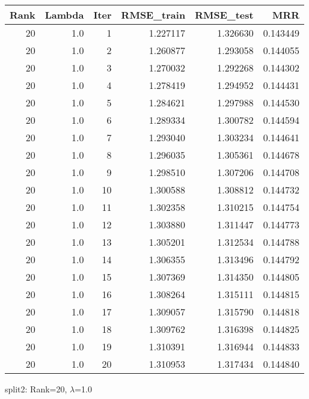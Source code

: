 \begin{tabular}{rrrrrr}
\toprule
 Rank &  Lambda &  Iter &  RMSE\_train &  RMSE\_test &       MRR \\
\midrule
   20 &     1.0 &     1 &    1.227117 &   1.326630 &  0.143449 \\
   20 &     1.0 &     2 &    1.260877 &   1.293058 &  0.144055 \\
   20 &     1.0 &     3 &    1.270032 &   1.292268 &  0.144302 \\
   20 &     1.0 &     4 &    1.278419 &   1.294952 &  0.144431 \\
   20 &     1.0 &     5 &    1.284621 &   1.297988 &  0.144530 \\
   20 &     1.0 &     6 &    1.289334 &   1.300782 &  0.144594 \\
   20 &     1.0 &     7 &    1.293040 &   1.303234 &  0.144641 \\
   20 &     1.0 &     8 &    1.296035 &   1.305361 &  0.144678 \\
   20 &     1.0 &     9 &    1.298510 &   1.307206 &  0.144708 \\
   20 &     1.0 &    10 &    1.300588 &   1.308812 &  0.144732 \\
   20 &     1.0 &    11 &    1.302358 &   1.310215 &  0.144754 \\
   20 &     1.0 &    12 &    1.303880 &   1.311447 &  0.144773 \\
   20 &     1.0 &    13 &    1.305201 &   1.312534 &  0.144788 \\
   20 &     1.0 &    14 &    1.306355 &   1.313496 &  0.144792 \\
   20 &     1.0 &    15 &    1.307369 &   1.314350 &  0.144805 \\
   20 &     1.0 &    16 &    1.308264 &   1.315111 &  0.144815 \\
   20 &     1.0 &    17 &    1.309057 &   1.315790 &  0.144818 \\
   20 &     1.0 &    18 &    1.309762 &   1.316398 &  0.144825 \\
   20 &     1.0 &    19 &    1.310391 &   1.316944 &  0.144833 \\
   20 &     1.0 &    20 &    1.310953 &   1.317434 &  0.144840 \\
\bottomrule
\end{tabular}

\caption{split2: Rank=20, $\lambda$=1.0}
